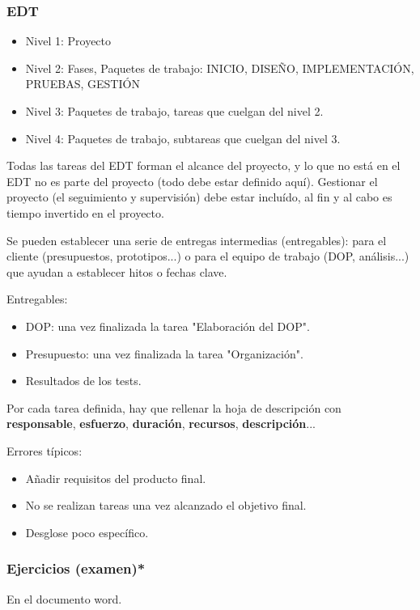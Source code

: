 \documentclass{article}
\begin{document}
\subsubsection{EDT}
\begin{itemize}
	\item Nivel 1: Proyecto
	\item Nivel 2: Fases, Paquetes de trabajo: INICIO, DISEÑO, IMPLEMENTACIÓN, PRUEBAS, GESTIÓN
	\item Nivel 3: Paquetes de trabajo, tareas que cuelgan del nivel 2.
	\item Nivel 4: Paquetes de trabajo, subtareas que cuelgan del nivel 3.
\end{itemize}
Todas las tareas del EDT forman el alcance del proyecto, y lo que no está en el EDT no es parte del proyecto (todo debe estar definido aquí). 
Gestionar el proyecto (el seguimiento y supervisión) debe estar incluído, al fin y al cabo es tiempo invertido en el proyecto. 

Se pueden establecer una serie de entregas intermedias (entregables): para el cliente (presupuestos, prototipos...) o para el equipo de trabajo (DOP, análisis...) que ayudan a establecer hitos o fechas clave. 

Entregables:
\begin{itemize}
	\item DOP: una vez finalizada la tarea "Elaboración del DOP".
	\item Presupuesto: una vez finalizada la tarea "Organización".
	\item Resultados de los tests.
\end{itemize}

Por cada tarea definida, hay que rellenar la hoja de descripción con \textbf{responsable}, \textbf{esfuerzo}, \textbf{duración}, \textbf{recursos}, \textbf{descripción}...

Errores típicos:
\begin{itemize}
	\item Añadir requisitos del producto final.
	\item No se realizan tareas una vez alcanzado el objetivo final.
	\item Desglose poco específico.
\end{itemize}

\subsubsection{Ejercicios (examen)*}
En el documento word.
\end{document}
